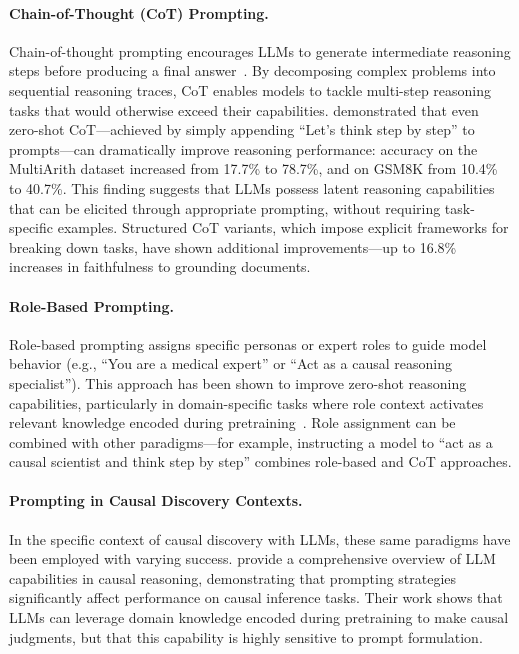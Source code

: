 \paragraph{Chain-of-Thought (CoT) Prompting.}
Chain-of-thought prompting encourages LLMs to generate intermediate reasoning steps before producing a final answer~\citep{wei2022chain}. By decomposing complex problems into sequential reasoning traces, CoT enables models to tackle multi-step reasoning tasks that would otherwise exceed their capabilities. \citet{kojima2022large} demonstrated that even zero-shot CoT---achieved by simply appending ``Let's think step by step'' to prompts---can dramatically improve reasoning performance: accuracy on the MultiArith dataset increased from 17.7\% to 78.7\%, and on GSM8K from 10.4\% to 40.7\%. This finding suggests that LLMs possess latent reasoning capabilities that can be elicited through appropriate prompting, without requiring task-specific examples. Structured CoT variants, which impose explicit frameworks for breaking down tasks, have shown additional improvements---up to 16.8\% increases in faithfulness to grounding documents.

\paragraph{Role-Based Prompting.}
Role-based prompting assigns specific personas or expert roles to guide model behavior (e.g., ``You are a medical expert'' or ``Act as a causal reasoning specialist''). This approach has been shown to improve zero-shot reasoning capabilities, particularly in domain-specific tasks where role context activates relevant knowledge encoded during pretraining~\citep{kong2024betterzeroshotreasoningroleplay, ruangtanusak2025talklessrightenhancing}. Role assignment can be combined with other paradigms---for example, instructing a model to ``act as a causal scientist and think step by step'' combines role-based and CoT approaches.

\paragraph{Prompting in Causal Discovery Contexts.}

In the specific context of causal discovery with LLMs, these same paradigms have been employed with varying success. \citet{kiciman2024causal} provide a comprehensive overview of LLM capabilities in causal reasoning, demonstrating that prompting strategies significantly affect performance on causal inference tasks. Their work shows that LLMs can leverage domain knowledge encoded during pretraining to make causal judgments, but that this capability is highly sensitive to prompt formulation.

